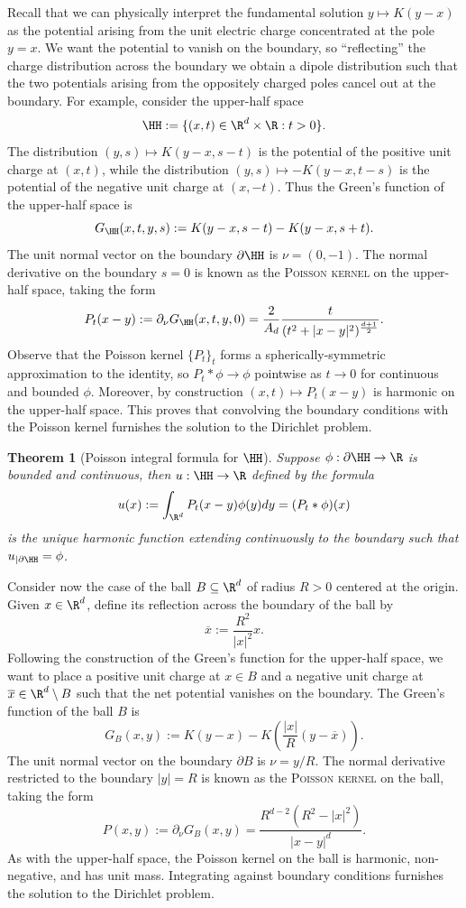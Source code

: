 \documentclass[reqno]{amsart}
\newtheorem{theorem}{Theorem}
\theoremstyle{definition}
\theoremstyle{remark}
\renewcommand{\emph}{\textsc}
\begin{document}
Recall that we can physically interpret the fundamental solution $y \mapsto K(y - x)$ as the potential arising from the unit electric charge concentrated at the pole $y = x$. We want the potential to vanish on the boundary, so ``reflecting'' the charge distribution across the boundary we obtain a dipole distribution such that the two potentials arising from the oppositely charged poles cancel out at the boundary. For example, consider the upper-half space 
	\[ \HH := \{ (x, t) \in \R^d \times \R : t > 0 \}. \]
The distribution $(y, s) \mapsto K(y - x, s - t)$ is the potential of the positive unit charge at $(x, t)$, while the distribution $(y, s) \mapsto -K(y - x, t - s)$ is the potential of the negative unit charge at $(x, -t)$. Thus the Green's function of the upper-half space is 
	\[ G_\HH (x, t, y, s) := K(y - x, s - t) - K(y - x, s + t). \]
The unit normal vector on the boundary $\partial \HH$ is $\nu = (0, -1)$. The normal derivative on the boundary $s = 0$ is known as the \emph{Poisson kernel} on the upper-half space, taking the form
	\[ P_t (x - y) := \partial_\nu G_\HH (x, t, y, 0) = \frac{2}{A_d} \frac{t}{(t^2 + |x - y|^2)^{\frac{d + 1}{2}}}. \]
Observe that the Poisson kernel $\{P_t\}_t$ forms a spherically-symmetric approximation to the identity, so $P_t * \phi \to \phi$ pointwise as $t \to 0$ for continuous and bounded $\phi$. Moreover, by construction $(x, t) \mapsto P_t (x - y)$ is harmonic on the upper-half space. This proves that convolving the boundary conditions with the Poisson kernel furnishes the solution to the Dirichlet problem. 
	

\begin{theorem}[Poisson integral formula for $\HH$]
	Suppose $\phi : \partial \HH \to \R$ is bounded and continuous, then $u : \HH \to \R$ defined by the formula
		\[ u(x) := \int_{\R^d} P_t (x - y) \phi(y) d y = (P_t * \phi)(x) \]
	is the unique harmonic function extending continuously to the boundary such that $u_{|\partial \HH} = \phi$. 
\end{theorem}

Consider now the case of the ball $B \subseteq \R^d$ of radius $R > 0$ centered at the origin. Given $x \in \R^d$, define its reflection across the boundary of the ball by 
	\[ \overline x := \frac{R^2}{|x|^2} x. \]
Following the construction of the Green's function for the upper-half space, we want to place a positive unit charge at $x \in B$ and a negative unit charge at $\overline x \in \R^d \setminus B$ such that the net potential vanishes on the boundary. The Green's function of the ball $B$ is
	\[ G_B (x, y) := K(y - x) - K\left( \frac{|x|}{R}(y - \overline x)\right). \]
The unit normal vector on the boundary $\partial B$ is $\nu = y/R$. The normal derivative restricted to the boundary $|y| = R$ is known as the \emph{Poisson kernel} on the ball, taking the form 
	\[ P (x, y) := \partial_\nu G_B (x, y) =\frac{R^{d - 2} (R^2 - |x|^2)}{|x - y|^d}.  \]
As with the upper-half space, the Poisson kernel on the ball is harmonic, non-negative, and has unit mass. Integrating against boundary conditions furnishes the solution to the Dirichlet problem. 
\end{document}
